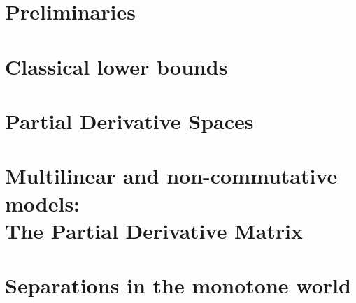 \onehalfspace




\tableofcontents





\part{Preliminaries}










\part{Classical lower bounds}







\part{Partial Derivative Spaces}






\part[Multilinear and non-commutative models]{Multilinear and non-commutative models:\\The Partial Derivative Matrix}












\part{Separations in the monotone world}

